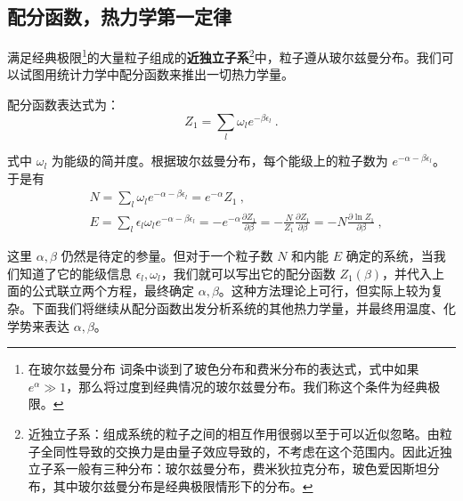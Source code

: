 


\subsection{配分函数，热力学第一定律}

满足经典极限\footnote{在玻尔兹曼分布 词条中谈到了玻色分布和费米分布的表达式，式中如果 $e^\alpha\gg 1$，那么将过度到经典情况的玻尔兹曼分布。我们称这个条件为经典极限。}的大量粒子组成的\textbf{近独立子系}\footnote{近独立子系：组成系统的粒子之间的相互作用很弱以至于可以近似忽略。由粒子全同性导致的交换力是由量子效应导致的，不考虑在这个范围内。因此近独立子系一般有三种分布：玻尔兹曼分布，费米狄拉克分布，玻色爱因斯坦分布，其中玻尔兹曼分布是经典极限情形下的分布。}中，粒子遵从玻尔兹曼分布。我们可以试图用统计力学中配分函数来推出一切热力学量。

配分函数表达式为：
\begin{equation}
Z_1=\sum_l \omega_l e^{-\beta \epsilon_l}~.
\end{equation}

式中 $\omega_l$ 为能级的简并度。根据玻尔兹曼分布，每个能级上的粒子数为 $e^{-\alpha-\beta\epsilon_l}$。于是有
\begin{equation}\label{eq_TheSta_4}
\begin{aligned}
&N=\sum_l \omega_l e^{-\alpha-\beta\epsilon_l}=e^{-\alpha} Z_1~,\\
&E=\sum_l \epsilon_l \omega_l e^{-\alpha-\beta\epsilon_l}=-e^{-\alpha}\frac{\partial Z_1}{\partial \beta}=-\frac{N}{Z_1}\frac{\partial Z_1}{\partial \beta}=-N\frac{\partial \ln Z_1}{\partial \beta}~,
\end{aligned}
\end{equation}

这里 $\alpha,\beta$ 仍然是待定的参量。但对于一个粒子数 $N$ 和内能 $E$ 确定的系统，当我们知道了它的能级信息 $\epsilon_l,\omega_l$，我们就可以写出它的配分函数 $Z_1(\beta)$，并代入上面的公式联立两个方程，最终确定 $\alpha,\beta$。这种方法理论上可行，但实际上较为复杂。下面我们将继续从配分函数出发分析系统的其他热力学量，并最终用温度、化学势来表达 $\alpha,\beta$。
